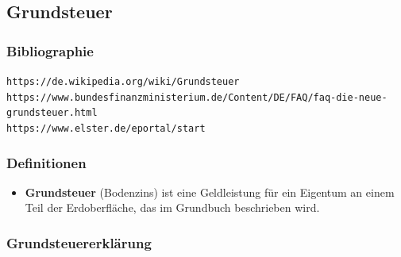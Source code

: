 \documentclass[10pt,a4paper]{article}
\newcommand\emps[1] {{\color {indigo(web)} {\bf #1}}}          %
\begin{document}
\subsection{Grundsteuer}

\subsubsection{Bibliographie}

\verb+https://de.wikipedia.org/wiki/Grundsteuer+ \\
\verb+https://www.bundesfinanzministerium.de/Content/DE/FAQ/faq-die-neue-grundsteuer.html+ \\
\verb+https://www.elster.de/eportal/start+

\subsubsection{Definitionen}

\begin{mdframed}[style=daystyle, leftmargin=-25pt]
  \begin{itemize}
    \setlength\itemsep{-3pt}
  \item {\emps {Grundsteuer}} (Bodenzins) ist eine Geldleistung für ein
    Eigentum an einem Teil der Erdoberfläche, das im Grundbuch beschrieben wird.
  \end{itemize}
\end{mdframed}

\subsubsection{Grundsteuererklärung}
\end{document}
